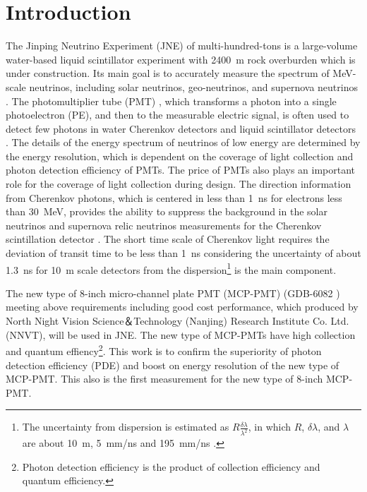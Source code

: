 \section{Introduction}
The Jinping Neutrino Experiment (JNE) of multi-hundred-tons is a large-volume water-based liquid scintillator experiment with \SI{2400}{m} rock overburden \cite{LetterJNE2017} which is under construction. Its main goal is to accurately measure the spectrum of MeV-scale neutrinos, including solar neutrinos, geo-neutrinos, and supernova neutrinos \cite{LetterJNE2017}. %
The photomultiplier tube (PMT) \cite{HAMAMATSUManual}, which transforms a photon into a single photoelectron (PE), and then to the measurable electric signal, is often used to detect few photons in water Cherenkov detectors \cite{SNO,SuperK} and liquid scintillator detectors \cite{KamLAND,JUNO:2015zny}. The details of the energy spectrum of neutrinos of low energy are determined by the energy resolution, which is dependent on the coverage of light collection and photon detection efficiency of PMTs. The price of PMTs also plays an important role for the coverage of light collection during design. The direction information from Cherenkov photons, which is centered in less than \SI{1}{ns} for electrons less than \SI{30}{MeV}, provides the ability to suppress the background in the solar neutrinos and supernova relic neutrinos measurements for the Cherenkov scintillation detector \cite{Guo_2019}. The short time scale of Cherenkov light requires the deviation of transit time to be less than \SI{1}{ns} considering the uncertainty of about \SI{1.3}{ns} for \SI{10}{m} scale detectors from the dispersion\footnote{The uncertainty from dispersion is estimated as $R\frac{\delta\lambda}{\lambda^2}$, in which $R$, $\delta\lambda$, and $\lambda$ are about \SI{10}{m}, \SI{5}{mm/ns} and \SI{195}{mm/ns} \cite{Luo:2022xrd}.} is the main component.

The new type of 8-inch micro-channel plate PMT (MCP-PMT) (GDB-6082 \cite{GDB-6082}) meeting above requirements including good cost performance, which produced by North Night Vision Science＆Technology (Nanjing) Research Institute Co. Ltd. (NNVT), will be used in JNE. The new type of MCP-PMTs have high collection and quantum effiency\footnote{Photon detection efficiency is the product of collection efficiency and quantum efficiency.}. This work is to confirm the superiority of photon detection efficiency (PDE) and boost on energy resolution of the new type of MCP-PMT. This also is the first measurement for the new type of 8-inch MCP-PMT.

